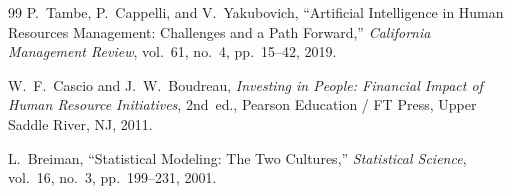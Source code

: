 \documentclass[12pt,a4paper,oneside]{report}
\begin{document}
\begin{thebibliography}{99}
P.~Tambe, P.~Cappelli, and V.~Yakubovich, ``Artificial Intelligence in Human Resources Management: Challenges and a Path Forward,'' \textit{California Management Review}, vol.~61, no.~4, pp.~15--42, 2019.

W.~F.~Cascio and J.~W.~Boudreau, \textit{Investing in People: Financial Impact of Human Resource Initiatives}, 2nd~ed., Pearson Education / FT Press, Upper Saddle River, NJ, 2011.

L.~Breiman, ``Statistical Modeling: The Two Cultures,'' \textit{Statistical Science}, vol.~16, no.~3, pp.~199--231, 2001.

\end{thebibliography}
\end{document}
